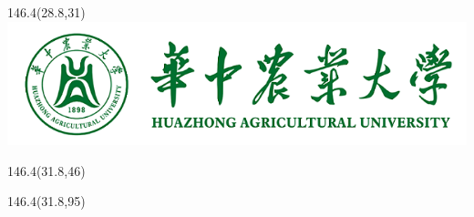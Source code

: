 

\thispagestyle{empty}
\begin{titlepage}
	\captionsetup{belowskip=0pt}
	
	\renewcommand{\ULthickness}{1.2pt}
	\begin{center}\noindent \bfseries {}\end{center}

	\begin{textblock}{146.4}(28.8,31)
		\centering
		\includegraphics{./figures/hzau.png} %
	\end{textblock}

	\begin{textblock}{146.4}(31.8,46)
		\noindent
		\begin{minipage}[t][8.2cm][c]{\linewidth}
			\begin{center}
				\noindent\textbf{\zihao{1}{\rmfamily{\expandafter\expandafter{\TitleCHS}}}}
			\end{center}
			\begin{center}
				\noindent\textbf{\zihao{1}{\rmfamily{\expandafter\expandafter{\TitleENG}}}}
			\end{center}
		\end{minipage}
	\end{textblock}

	\renewcommand{\ULthickness}{0.4pt}
	
	\begin{textblock}{146.4}(31.8,95) %
		\noindent
		\begin{minipage}[t][8.2cm][c]{\linewidth}
			\begin{center}
				\noindent\textbf{\zihao{1}{\rmfamily{\expandafter\expandafter{\ThesisTitleCHS}}}}
			\end{center}
			\begin{center}
				\noindent\textbf{\zihao{1}{\rmfamily{\expandafter\expandafter{\ThesisTitleENG}}}}
			\end{center}
		\end{minipage}
	\end{textblock}


\end{titlepage}
